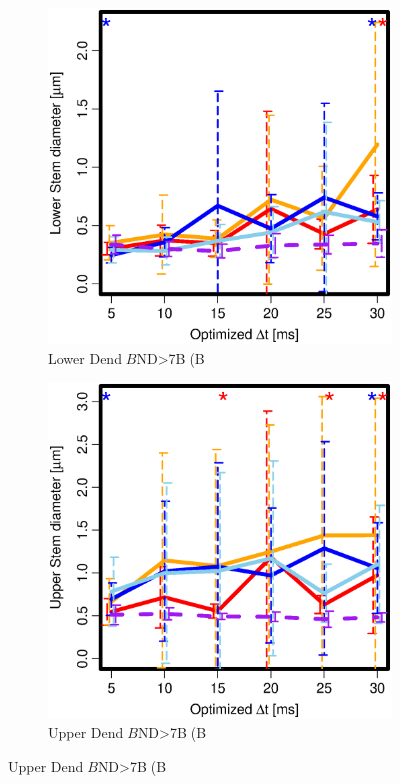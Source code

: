      \begin{figure}[H]
       \begin{subfigure}{0.5\columnwidth}
         \centering
         \includegraphics[width=0.8\columnwidth]{./Images_Result/k_ca_test_Lower_Diam.eps}
         \caption{Lower Dend$B$ND>7B(B}
         \label{k_ca_Lower_Diam}
       \end{subfigure}
       \begin{subfigure}{0.5\columnwidth}
         \centering
         \includegraphics[width=0.8\columnwidth]{./Images_Result/k_ca_test_Upper_Diam.eps}
         \caption{Upper Dend$B$ND>7B(B}
         \label{k_ca_Upper_Diam}
       \end{subfigure}


\end{figure}
